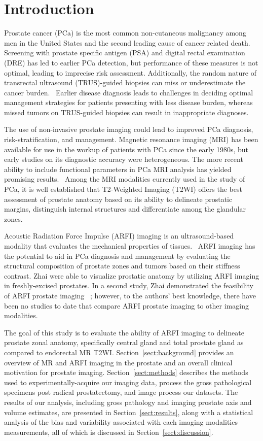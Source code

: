 \section{Introduction}\label{sect:intro}
Prostate cancer (PCa) is the most common non-cutaneous malignancy among men in
the United States and the second leading cause of cancer related
death.~\cite{Howlader2011} Screening with prostate specific antigen (PSA) and
digital rectal examination (DRE) has led to earlier PCa detection, but
performance of these measures is not optimal, leading to imprecise risk
assessment.  Additionally, the random nature of transrectal ultrasound
(TRUS)-guided biopsies can miss or underestimate the cancer
burden.~\cite{Gupta2013} Earlier disease diagnosis leads to challenges in
deciding optimal management strategies for patients presenting with less
disease burden, whereas missed tumors on TRUS-guided biopsies can result in
inappropriate diagnoses. 

The use of non-invasive prostate imaging could lead to improved PCa diagnosis,
risk-stratification, and management.  Magnetic resonance imaging (MRI) has been
available for use in the workup of patients with PCa since the early 1980s, but
early studies on its diagnostic accuracy were heterogeneous.  The more
recent ability to include functional parameters in PCa MRI analysis has yielded
promising results.~\cite{Gupta2013,Hricak2007} Among the MRI modalities
currently used in the study of PCa, it is well established that T2-Weighted
Imaging (T2WI) offers the best assessment of prostate anatomy based on its
ability to delineate prostatic margins, distinguish internal structures and
differentiate among the glandular zones. 

Acoustic Radiation Force Impulse (ARFI) imaging is an ultrasound-based modality
that evaluates the mechanical properties of tissues.~\cite{Nightingale2002b}
ARFI imaging has the potential to aid in PCa diagnosis and management by
evaluating the structural composition of prostate zones and tumors based on
their stiffness contrast.  Zhai \etal were able to visualize prostatic anatomy
by utilizing ARFI imaging in freshly-excised prostates. In a second study, Zhai
\etal demonstrated the feasibility of ARFI prostate imaging
\invivo~\cite{Zhai2012}; however, to the authors’ best knowledge, there have
been no studies to date that compare \invivo ARFI prostate imaging to other
imaging modalities.~\cite{Zhai2010} 

The goal of this study is to evaluate the ability of ARFI imaging to delineate
prostate zonal anatomy, specifically central gland and total prostate gland
\invivo as compared to endorectal MR T2WI.  Section~\ref{sect:background}
provides an overview of MR and ARFI imaging in the prostate and an overall
clinical motivation for prostate imaging.  Section~\ref{sect:methods} describes
the methods used to experimentally-acquire our imaging data, process the gross
pathological specimens post radical prostatectomy, and image process our
datasets.  The results of our analysis, including gross pathology and imaging
prostate axis and volume estimates, are presented in
Section~\ref{sect:results}, along with a statistical analysis of the bias and
variability associated with each imaging modalities measurements, all of which
is discussed in Section~\ref{sect:discussion}.
